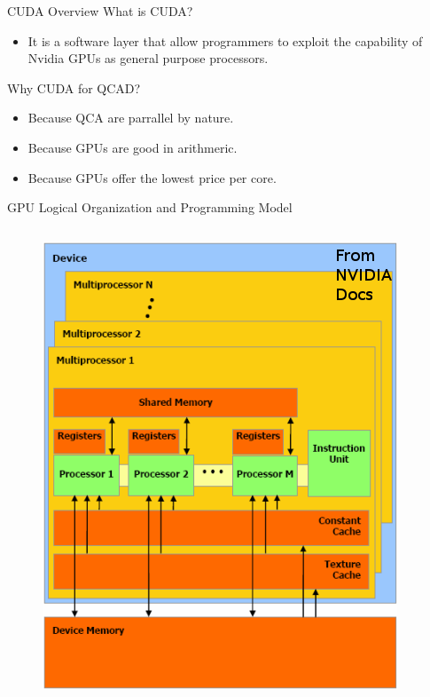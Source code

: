 \documentclass[10pt, red]{beamer}
\begin{document}
	\begin{frame}{CUDA Overview}
		What is CUDA?		
		\begin{itemize}
			\item It is a software layer that allow programmers to exploit the capability of Nvidia GPUs as general purpose processors.
		\end{itemize}
		Why CUDA for QCAD?
		\begin{itemize}
			\item Because QCA are parrallel by nature.
			\item Because GPUs are good in arithmeric.
			\item Because GPUs offer the lowest price per core.
		\end{itemize}
	\end{frame}

	\begin{frame}{GPU Logical Organization and Programming Model}
		\begin{columns}
		 	\begin{figure}
				\centering
				\includegraphics[width=\textwidth, height=0.6\textheight]{img/HWModel}

\end{figure}
\end{columns}
\end{frame}
\end{document}
